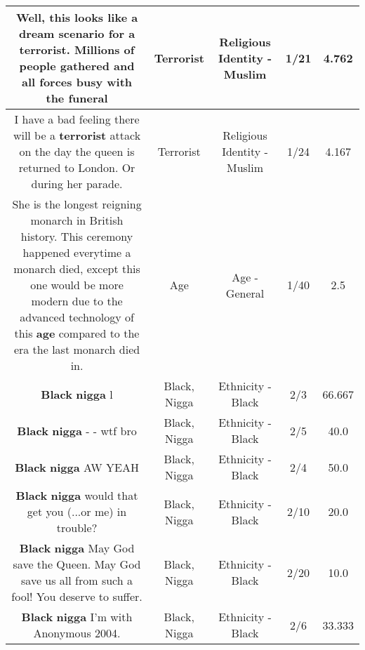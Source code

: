 \documentclass[11pt]{article}
\newlength\mylength
\begin{document}
\begin{center}
\begin{longtable}{|C{.65\mylength}|C{.30\mylength}|C{.12\mylength}|C{.12\mylength}|C{.12\mylength}|}
  \small Well, this looks like a dream scenario for a \textbf{terrorist}. Millions of people gathered and all forces busy with the funeral\normalsize   & Terrorist & Religious Identity - Muslim & 1/21 & 4.762 \\  \hline
  \small I have a bad feeling there will be a \textbf{terrorist} attack on the day the queen is returned to London. Or during her parade.\normalsize   & Terrorist & Religious Identity - Muslim & 1/24 & 4.167 \\  \hline
  \small She is the longest reigning monarch in British history. This ceremony happened everytime a monarch died, except this one would be more modern due to the advanced technology of this \textbf{age} compared to the era the last monarch died in.\normalsize   & Age & Age - General & 1/40 & 2.5 \\  \hline
  \small \@\textbf{Black} \textbf{nigga} l\normalsize   & Black, Nigga & Ethnicity - Black & 2/3 & 66.667 \\  \hline
  \small \@\textbf{Black} \textbf{nigga} - - wtf bro\normalsize   & Black, Nigga & Ethnicity - Black & 2/5 & 40.0 \\  \hline
  \small \@\textbf{Black} \textbf{nigga} AW YEAH\normalsize   & Black, Nigga & Ethnicity - Black & 2/4 & 50.0 \\  \hline
  \small \@\textbf{Black} \textbf{nigga} would that get you (...or me) in trouble?\normalsize   & Black, Nigga & Ethnicity - Black & 2/10 & 20.0 \\  \hline
  \small \@\textbf{Black} \textbf{nigga} May God save the Queen. May God save us all from such a fool! You deserve to suffer.\normalsize   & Black, Nigga & Ethnicity - Black & 2/20 & 10.0 \\  \hline
  \small \@\textbf{Black} \textbf{nigga} I'm with Anonymous 2004.\normalsize   & Black, Nigga & Ethnicity - Black & 2/6 & 33.333 \\  \hline

\end{longtable}
\end{center}
\end{document}
